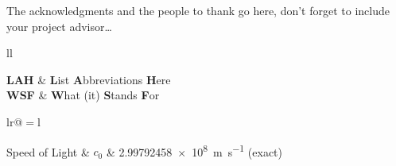 \documentclass[
11pt, %
english, %
singlespacing, %
headsepline, %
]{style} %
\begin{document}

\begin{acknowledgements}
	\addchaptertocentry{\acknowledgementname} %
	The acknowledgments and the people to thank go here, don't forget to include your project advisor\ldots
\end{acknowledgements}


\tableofcontents %

\listoffigures %

\listoftables %


\begin{abbreviations}{ll} %

	\textbf{LAH} & \textbf{L}ist \textbf{A}bbreviations \textbf{H}ere\\
	\textbf{WSF} & \textbf{W}hat (it) \textbf{S}tands \textbf{F}or\\

\end{abbreviations}


\begin{constants}{lr@{${}={}$}l} %


	Speed of Light & $c_{0}$ & \SI{2.99792458e8}{\meter\per\second} (exact)\\

\end{constants}
\end{document}
